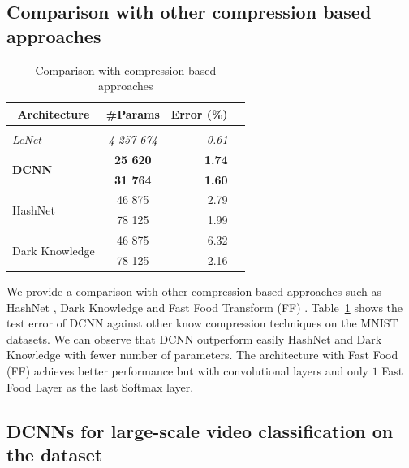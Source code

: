 \subsection{Comparison with other compression based approaches}


\begin{table}
  \centering
    \caption{Comparison with compression based approaches}
    \begin{tabular}{lcrc}
    \toprule
    \multicolumn{1}{c}{\textbf{Architecture}} & \multicolumn{1}{c}{\textbf{\#Params}} & \textbf{Error (\%)} \\
    \hline \\
    \textit{LeNet \cite{Lecun98gradient-basedlearning}} & \textit{4 257 674} & \textit{0.61} \\
    \multirow{2}[0]{*}{\textbf{DCNN}} & \textbf{25 620} & \textbf{1.74} \\
          & \textbf{31 764} & \textbf{1.60} \\
    \multirow{2}[0]{*}{HashNet \cite{Chen_Hashing_Trick}} & 46 875 & 2.79 \\
          &  78 125 & 1.99 \\
    \multirow{2}[0]{*}{Dark Knowledge \cite{44873}} & 46 875 & 6.32 \\
          &  78 125 & 2.16 \\
    \bottomrule
    \end{tabular}%
  \label{tab:mnist}%
\end{table}%


We provide a comparison with other compression based approaches such as HashNet \cite{Chen_Hashing_Trick}, Dark Knowledge \cite{44873} and Fast Food Transform (FF) \cite{7410530}. 
Table~\ref{tab:mnist} shows the test error of DCNN against other know compression techniques on the MNIST datasets. We can observe that DCNN outperform easily HashNet \cite{Chen_Hashing_Trick} and Dark Knowledge \cite{44873} with fewer number of parameters. The architecture with Fast Food (FF) \cite{7410530} achieves better performance but with convolutional layers and only $1$ Fast Food Layer as the last Softmax layer. 


\subsection{DCNNs for large-scale video classification on the \yt dataset}

